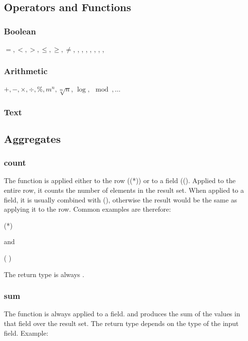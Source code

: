 \subsection{Operators and Functions}
\subsubsection{Boolean}
$=,<,>,\le,\ge,\neq$,
,
, , ,
, , ,

\subsubsection{Arithmetic}
$+,-,\times, \div, \%, m^n, \sqrt[m]{n}$,
$\log, \mod, \dots$


\subsubsection{Text}

\subsection{Aggregates}\label{sec_agg}
\subsubsection{count}
The function is applied either to the row ((*))
or to a field (().
Applied to the entire row, it counts the number of elements
in the result set.
When applied to a field, it is usually combined with
 (),
otherwise the result would be the same as applying it to the row.
Common examples are therefore:

 (*)  

and

 ( )
 

The return type is always .


\subsubsection{sum}
The function is always applied to a field.
and produces the sum of the values in that field over the result set.
The return type depends on the type of the input field.
Example:

